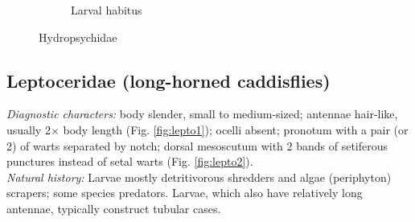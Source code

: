 \documentclass[letterpaper, 11pt]{article}
\begin{document}
\begin{figure}[ht!]
\begin{subfigure}[ht!]{0.4\textwidth}
        \caption{Larval habitus \citep[][Fig. 281]{bhl50956}}
        \label{fig:hydropsychid2}
    \end{subfigure}
    \caption{Hydropsychidae}\label{fig:hydropsychids}
\end{figure}

\subsection{Leptoceridae (long-horned caddisflies)}%
\noindent{}\textit{Diagnostic characters:} body slender, small to medium-sized; antennae hair-like, usually 2$\times$ body length (Fig. \ref{fig:lepto1}); ocelli absent; pronotum with a pair (or 2) of warts separated by notch; dorsal mesoscutum with 2 bands of setiferous punctures instead of setal warts (Fig. \ref{fig:lepto2}).\\

\noindent{}\textit{Natural history:} Larvae mostly detritivorous shredders and algae (periphyton) scrapers; some species predators. Larvae, which also have relatively long antennae, typically construct tubular cases.
\end{document}
